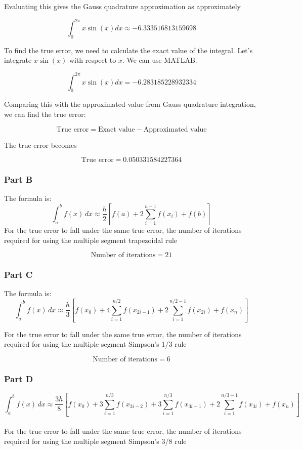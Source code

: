 \documentclass[12pt, a4paper]{article}
\numberwithin{equation}{section}
\begin{document}
Evaluating this gives the Gauss quadrature approximation as approximately 

\begin{equation}
\int_{0}^{2\pi} x \sin(x) dx \approx -6.333516813159698
\end{equation}

To find the true error, we need to calculate the exact value of the integral. Let's integrate \(x \sin(x)\) with respect to \(x\). We can use MATLAB.


\begin{equation}
\int_{0}^{2\pi} x \sin(x) dx = -6.283185228932334
\end{equation}

Comparing this with the approximated value from Gauss quadrature integration, we can find the true error:

\[
\text{True error} = \text{Exact value} - \text{Approximated value}
\]

The true error becomes

\[
\text{True error} = 0.050331584227364
\]



\subsubsection{Part B}
The formula is:
\begin{equation}
    \int_a^b f(x) \, dx \approx \frac{h}{2} \left[ f(a) + 2 \sum_{i=1}^{n-1} f(x_i) + f(b) \right]
\end{equation}
For the true error to fall under the same true error, the number of iterations required for using the multiple segment trapezoidal rule

\[
\text{Number of iterations} = 21
\]

\subsubsection{Part C}
The formula is:
\begin{equation}
\int_a^b f(x) \, dx \approx \frac{h}{3} \left[ f(x_0) + 4 \sum_{i=1}^{n/2} f(x_{2i-1}) + 2 \sum_{i=1}^{n/2-1} f(x_{2i}) + f(x_n) \right]
\end{equation}

For the true error to fall under the same true error, the number of iterations required for using the multiple segment Simpson’s 1/3 rule

\[
\text{Number of iterations} = 6
\]
\subsubsection{Part D}
\begin{equation}
    \int_a^b f(x) \, dx \approx \frac{3h}{8} \left[ f(x_0) + 3 \sum_{i=1}^{n/3} f(x_{3i-2}) + 3 \sum_{i=1}^{n/3} f(x_{3i-1}) + 2 \sum_{i=1}^{n/3-1} f(x_{3i}) + f(x_n) \right]
\end{equation}
\\
For the true error to fall under the same true error, the number of iterations required for using the multiple segment Simpson’s 3/8 rule
\end{document}
